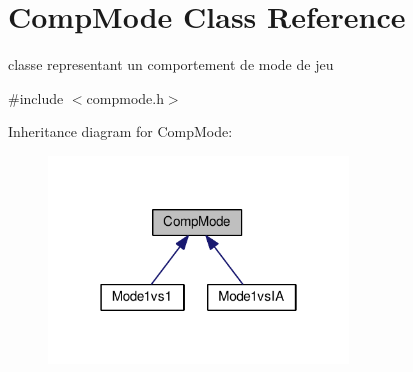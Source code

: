 \hypertarget{classCompMode}{\section{Comp\+Mode Class Reference}
\label{classCompMode}
}


classe representant un comportement de mode de jeu  




{\ttfamily \#include $<$compmode.\+h$>$}



Inheritance diagram for Comp\+Mode\+:
\nopagebreak
\begin{figure}[H]
\begin{center}
\leavevmode
\includegraphics[width=226pt]{classCompMode__inherit__graph}
\end{center}
\end{figure}
